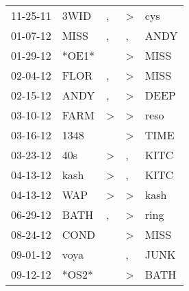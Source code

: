 \begin{supertabular}{p{0.07\textwidth}p{0.06\textwidth}p{0.02\textwidth}p{0.02\textwidth}p{0.06\textwidth}}
          11-25-11\textsuperscript{} &           3WID\textsuperscript{} &                , &     \textgreater &            cys\textsuperscript{} \\
          01-07-12\textsuperscript{} &           MISS\textsuperscript{} &                , &                , &           ANDY\textsuperscript{} \\
          01-29-12\textsuperscript{} &                            *OE1* &                  &     \textgreater &           MISS\textsuperscript{} \\
          02-04-12\textsuperscript{} &           FLOR\textsuperscript{} &                , &     \textgreater &           MISS\textsuperscript{} \\
          02-15-12\textsuperscript{} &           ANDY\textsuperscript{} &                , &     \textgreater &           DEEP\textsuperscript{} \\
          03-10-12\textsuperscript{} &           FARM\textsuperscript{} &     \textgreater &     \textgreater &           reso\textsuperscript{} \\
          03-16-12\textsuperscript{} &           1348\textsuperscript{} &                  &     \textgreater &           TIME\textsuperscript{} \\
          03-23-12\textsuperscript{} &            40s\textsuperscript{} &     \textgreater &                , &           KITC\textsuperscript{} \\
          04-13-12\textsuperscript{} &           kash\textsuperscript{} &     \textgreater &                , &           KITC\textsuperscript{} \\
          04-13-12\textsuperscript{} &            WAP\textsuperscript{} &     \textgreater &     \textgreater &           kash\textsuperscript{} \\
          06-29-12\textsuperscript{} &           BATH\textsuperscript{} &                , &     \textgreater &           ring\textsuperscript{} \\
          08-24-12\textsuperscript{} &           COND\textsuperscript{} &                  &     \textgreater &           MISS\textsuperscript{} \\
          09-01-12\textsuperscript{} &           voya\textsuperscript{} &                  &                , &           JUNK\textsuperscript{} \\
          09-12-12\textsuperscript{} &                            *OS2* &                  &     \textgreater &           BATH\textsuperscript{} \\

\end{supertabular}
